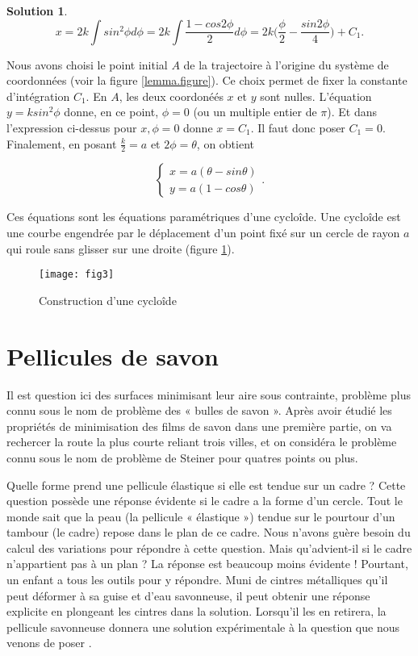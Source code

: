 \documentclass[10pt,a4paper]{article}%
\theoremstyle{theorem}
\theoremstyle{definition}
\newtheorem*{solution*}{Solution}
\begin{document}
\begin{solution*}
		\[x=2k\int sin^2\phi d\phi =2k\int\frac{1-cos2\phi}{2}d\phi=2k\big(\frac{\phi}{2}-\frac{sin2\phi}{4}\big)+C_1.\]
		
		Nous avons choisi le point initial $A$ de la trajectoire à l'origine du système de coordonnées (voir la figure \ref{lemma.figure}). Ce choix permet de fixer la constante d'intégration $C_1$. En $A$, les deux coordonéés $x$ et $y$ sont nulles. L'équation $y=ksin^2\phi$ donne, en ce point, $\phi=0$ (ou un multiple entier de $\pi$). Et dans l'expression ci-dessus pour $x, \phi=0$ donne $x=C_1$. Il faut donc poser $C_1=0$. Finalement, en posant $\frac{k}{2}=a$ et $2\phi=\theta$, on obtient 
		
		\begin{equation*}
			\begin{cases}
			x=a(\theta-sin\theta)
			\\
			y=a(1-cos\theta)
			\end{cases}.
		\end{equation*}
		
		Ces équations sont les équations paramétriques d'une cycloîde. Une cycloîde est une courbe engendrée par le déplacement d'un point fixé sur un cercle de rayon $a$ qui roule sans glisser sur une droite (figure \ref{cycloide.figure}).
		
		\begin{figure}[h]\label{cycloide.figure}
			\begin{center}
				\texttt{[image: fig3]}
			\end{center}
		\caption{Construction d'une cycloîde}
		\end{figure}
		
		
	\end{solution*}
		
	\section{Pellicules de savon}\label{savon}
	Il est question ici des surfaces minimisant leur aire sous contrainte, problème plus connu sous le nom de problème des « bulles de savon ». Après avoir étudié les propriétés de minimisation des films de savon dans une première partie, on va rechercer la route la plus courte reliant trois villes, et on considéra le problème connu sous le nom de problème de Steiner pour quatres points ou plus.
		
	Quelle forme prend une pellicule  élastique si elle est tendue sur un cadre ? Cette
	question possède une réponse  évidente si le cadre a la forme d’un cercle. Tout le monde
	sait que la peau (la pellicule « élastique ») tendue sur le pourtour d’un tambour (le cadre)
	repose dans le plan de ce cadre. Nous n’avons guère besoin du calcul des variations pour
	répondre à cette question. Mais qu’advient-il si le cadre n’appartient pas à un plan ?
	La réponse est beaucoup moins  évidente ! Pourtant, un enfant a tous les outils pour y
	répondre. Muni de cintres métalliques qu’il peut déformer à sa guise et d’eau savonneuse,
	il peut obtenir une réponse explicite en plongeant les cintres dans la solution. Lorsqu’il
	les en retirera, la pellicule savonneuse donnera une solution expérimentale à la question
	que nous venons de poser \cite{bois}.
	
\end{document}
